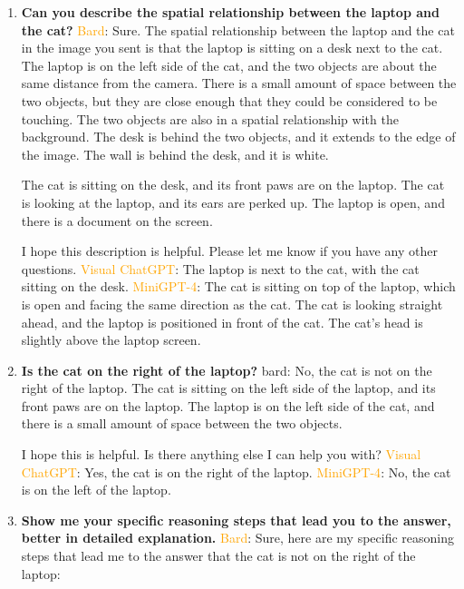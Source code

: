     \begin{enumerate}
        \item \textbf{Can you describe the spatial relationship between the laptop and the cat?}
        \subitem \textcolor{orange}{Bard}:
        Sure. The spatial relationship between the laptop and the cat in the image you sent is that the laptop is sitting on a desk next to the cat. The laptop is on the left side of the cat, and the two objects are about the same distance from the camera. There is a small amount of space between the two objects, but they are close enough that they could be considered to be touching.
        The two objects are also in a spatial relationship with the background. The desk is behind the two objects, and it extends to the edge of the image. The wall is behind the desk, and it is white.

        The cat is sitting on the desk, and its front paws are on the laptop. The cat is looking at the laptop, and its ears are perked up. The laptop is open, and there is a document on the screen.

        I hope this description is helpful. Please let me know if you have any other questions.
        \subitem \textcolor{orange}{Visual ChatGPT}: The laptop is next to the cat, with the cat sitting on the desk.
        \subitem \textcolor{orange}{MiniGPT-4}: The cat is sitting on top of the laptop, which is open and facing the same direction as the cat. The cat is looking straight ahead, and the laptop is positioned in front of the cat. The cat’s head is slightly above the laptop screen.
        \item \textbf{Is the cat on the right of the laptop?}
        \subitem bard: No, the cat is not on the right of the laptop. The cat is sitting on the left side of the laptop, and its front paws are on the laptop. The laptop is on the left side of the cat, and there is a small amount of space between the two objects.

        I hope this is helpful. Is there anything else I can help you with?
        \subitem \textcolor{orange}{Visual ChatGPT}: Yes, the cat is on the right of the laptop.
        \subitem \textcolor{orange}{MiniGPT-4}: No, the cat is on the left of the laptop.
        \item \textbf{Show me your specific reasoning steps that lead you to the answer, better in detailed explanation.}
        \subitem \textcolor{orange}{Bard}:
        Sure, here are my specific reasoning steps that lead me to the answer that the cat is not on the right of the laptop:
        

\end{enumerate}
